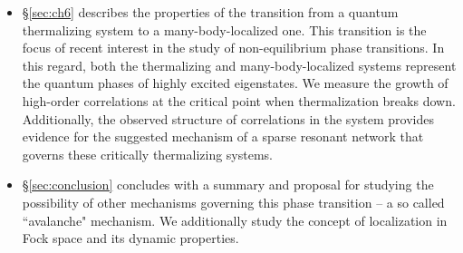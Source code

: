 \begin{itemize}
 \item \S \ref{sec:ch6} describes the properties of the transition from a quantum thermalizing system to a many-body-localized one. This transition is the focus of recent interest in the study of non-equilibrium phase transitions. In this regard, both the thermalizing and many-body-localized systems represent the quantum phases of highly excited eigenstates. We measure the growth of high-order correlations at the critical point when thermalization breaks down. Additionally, the observed structure of correlations in the system provides evidence for the suggested mechanism of a sparse resonant network that governs these critically thermalizing systems.
\item \S \ref{sec:conclusion} concludes with a summary and proposal for studying the possibility of other mechanisms governing this phase transition -- a so called ``avalanche" mechanism. We additionally study the concept of localization in Fock space and its dynamic properties. 
\end{itemize}




